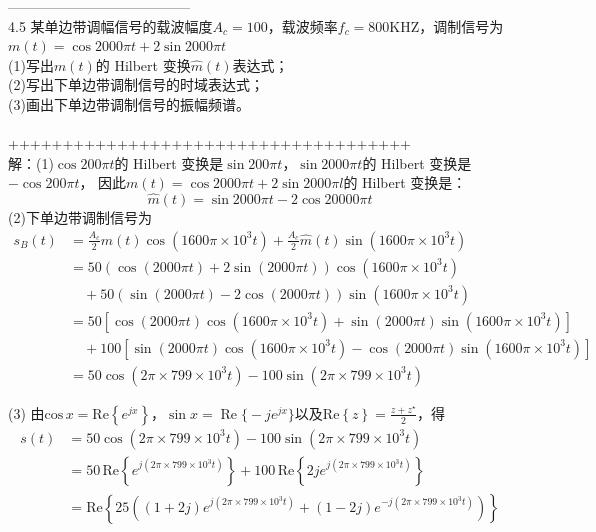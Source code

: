 \documentclass[utf8]{article}
\begin{document}
---------------------------------------\\
4.5 某单边带调幅信号的载波幅度$A_{c}=100$，载波频率$f_{c}=800\mathrm{KHZ}$，调制信号为$m(t)=\cos2000\pi t+2\sin2000\pi t$\\
(1)写出$m(t)$的 Hilbert 变换${\hat{m}}(t)$表达式； \\
 (2)写出下单边带调制信号的时域表达式； \\
 (3)画出下单边带调制信号的振幅频谱。 \\
 \\
 +++++++++++++++++++++++++++++++++++++\\
解：(1)$\cos200\pi t$的 Hilbert 变换是$\sin200\pi t$，$\sin2000\pi t$的 Hilbert 变换是$-\cos200\pi t$，
因此$m(t)=\cos2000\pi t+2\sin2000\pi l$的 Hilbert 变换是：
$${\hat{m}}\left(t\right)=\sin2000\pi t-2\cos20000\pi t$$
(2)下单边带调制信号为
\begin{align*}
s_{B}(t) &= \frac{A_{c}}{2} m(t) \cos(1600 \pi \times 10^{3} t) + \frac{A_{c}}{2} \hat{m}(t) \sin(1600 \pi \times 10^{3} t) \\
&= 50 \left( \cos(2000 \pi t) + 2 \sin(2000 \pi t) \right) \cos \left( 1600 \pi \times 10^{3} t \right) \\
&\quad + 50 \left( \sin(2000 \pi t) - 2 \cos(2000 \pi t) \right) \sin \left( 1600 \pi \times 10^{3} t \right) \\
&= 50 \left[ \cos(2000 \pi t) \cos \left( 1600 \pi \times 10^{3} t \right) + \sin(2000 \pi t) \sin \left( 1600 \pi \times 10^{3} t \right) \right] \\
&\quad + 100 \left[ \sin(2000 \pi t) \cos \left( 1600 \pi \times 10^{3} t \right) - \cos(2000 \pi t) \sin \left( 1600 \pi \times 10^{3} t \right) \right] \\
&= 50 \cos \left( 2 \pi \times 799 \times 10^{3} t \right) - 100 \sin \left( 2 \pi \times 799 \times 10^{3} t \right)
\end{align*}

(3) 由$\mathrm{cos}\,x=\mathrm{Re}\left\{e^{jx}\right\}$，$\sin x=\operatorname{Re}{\big\{}-j e^{j x}{\big\}}$以及$\mathrm{Re}\left\{z\right\}={\frac{z+z^{\star}}{2}}$，得
\begin{align*}
s(t) &= 50 \cos\left(2\pi \times 799 \times 10^{3} t\right) - 100 \sin\left(2\pi \times 799 \times 10^{3} t\right) \\
&= 50 \, \mathrm{Re}\left\{ e^{j(2\pi \times 799 \times 10^{3} t)} \right\} + 100 \, \mathrm{Re}\left\{ 2j e^{j(2\pi \times 799 \times 10^{3} t)} \right\} \\
&= \mathrm{Re}\left\lbrace 25 \left( (1+2j) e^{j(2\pi \times 799 \times 10^{3} t)} + (1-2j) e^{-j(2\pi \times 799 \times 10^{3} t)} \right) \right\rbrace
\end{align*}
\end{document}
